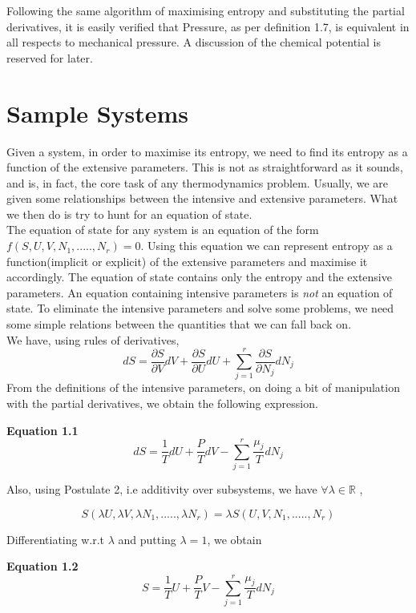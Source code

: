 \documentclass[oneside]{book}
\begin{document}
Following the same algorithm of maximising entropy and substituting the partial derivatives, it is easily verified that Pressure, as per definition 1.7, is equivalent in all respects to mechanical pressure. A discussion of the chemical potential is reserved for later.

\section{Sample Systems}
Given a system, in order to maximise its entropy, we need to find its entropy as a function of the extensive parameters. This is not as straightforward as it sounds, and is, in fact, the core task of any thermodynamics problem. Usually, we are given some relationships between the intensive and extensive parameters. What we then do is try to hunt for an equation of state.\\

The equation of state for any system is an equation of the form $f( S, U, V, N_1,.....,N_r) = 0$. Using this equation we can represent entropy as a function(implicit or explicit) of the extensive parameters and maximise it accordingly. The equation of state contains only the entropy and the extensive parameters. An equation containing intensive parameters is \emph{not} an equation of state. To eliminate the intensive parameters and solve some problems, we need some simple relations between the quantities that we can fall back on.\\

We have, using rules of derivatives,
\[dS = \frac{\partial S}{\partial V}dV+ \frac{\partial S}{\partial U}dU + \sum_{j = 1}^{r}\frac{\partial S}{\partial N_j}dN_j \]
From the definitions of the intensive parameters, on doing a bit of manipulation with the partial derivatives, we obtain the following expression.

\begin{mdframed}[style=exercise]
\textbf{Equation 1.1}
 \[dS =  \frac{1}{T}dU  + \frac{P}{T}dV - \sum_{j = 1}^{r}\frac{\mu_j}{T}dN_j\]
\end{mdframed}

Also, using Postulate 2, i.e additivity over subsystems, we have $\forall  \lambda \in  \mathbb{R}$ ,

\[S(\lambda U, \lambda V, \lambda N_1,....., \lambda N_r) = \lambda S(U,V,N_1,.....,N_r)  \]

Differentiating w.r.t $ \lambda$ and  putting $ \lambda = 1 $, we obtain

\begin{mdframed}[style=exercise]
\textbf{Equation 1.2}
 \[S =  \frac{1}{T}U  + \frac{P}{T}V - \sum_{j = 1}^{r}\frac{\mu_j}{T}dN_j\]
\end{mdframed}
\end{document}

